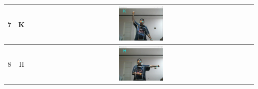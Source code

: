 \begin{table}[!hbt]
\begin{tabular}{|c|c|c|}
	\hline
	7 & K & \includegraphics[width=0.2\textwidth]{gambar/bener/HurufK_ModelCNNXception_Fachry.png} \\
	\hline
	8 & H & \includegraphics[width=0.2\textwidth]{gambar/bener/HurufH_ModelCNNXception_Fachry.png} \\
	\hline
	\end{tabular}
\end{table}